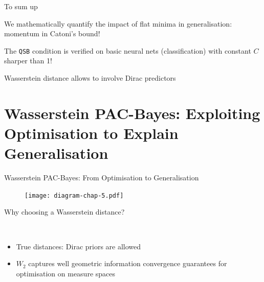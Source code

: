 \documentclass{presentation}
\begin{document}
\begin{xframe}{To sum up}
    \vspace{1cm}
    \Large
    \begin{xitemize}
        \item We mathematically quantify the impact of flat minima in generalisation: momentum in Catoni's bound!
        \item The \texttt{QSB} condition is verified on basic neural nets (classification) with constant $C$ sharper than 1! 
        \item Wasserstein distance allows to involve Dirac predictors
    \end{xitemize}
    \vspace{0.5cm}
    
\end{xframe}

\section{Wasserstein PAC-Bayes: Exploiting Optimisation to Explain Generalisation}

\begin{xframe}{Wasserstein PAC-Bayes: From Optimisation to Generalisation}
    \begin{figure}
        \centering
        \texttt{[image: diagram-chap-5.pdf]}
    \end{figure}
  \end{xframe}

  \begin{xframe}{Why choosing a Wasserstein distance?}
   \vspace{1cm}
   {\Large\bf {}\\
   \vspace{0.5cm}
   \begin{itemize}
    \item True distances: Dirac priors are allowed
    \item $W_2$ captures well geometric information \eg convergence guarantees for optimisation on measure spaces
   \end{itemize}
   }
   \vspace{0.5cm}
    \bf \Large {}
  \end{xframe}
\end{document}
